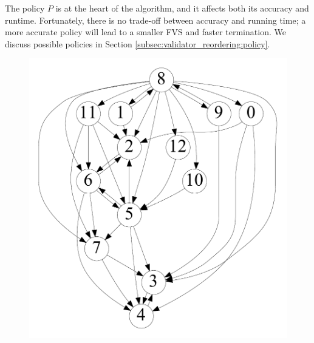 The policy $P$ is at the heart of the algorithm, and it affects both its accuracy and runtime. Fortunately, there is no trade-off between accuracy and running time; a more accurate policy will lead to a smaller FVS and faster termination. We discuss possible policies in Section \ref{subsec:validator_reordering:policy}.


\begin{figure}[t]
    \centering
    \begin{minipage}[b]{0.19\linewidth}
        \captionsetup{type=figure}
        \centering
            {\includegraphics[width=\textwidth]{./alg_fig/scc-g0}}
    \end{minipage}
   	\begin{minipage}[b]{0.19\linewidth}
        \centering

\end{minipage}
\end{figure}
